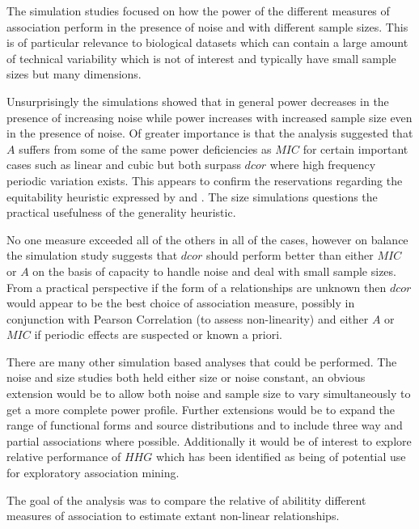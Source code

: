 \documentclass[a4paper, 12pt]{report}
\begin{document}
The simulation studies focused on how the power of the different measures of association perform in the presence of noise and with different sample sizes. This is of particular relevance to biological datasets which can contain a large amount of technical variability which is not of interest and typically have small sample sizes but many dimensions. 

Unsurprisingly the simulations showed that in general power decreases in the presence of increasing noise while power increases with increased sample size even in the presence of noise. Of greater importance is that the analysis suggested that $A$ suffers from some of the same power deficiencies as $MIC$ for certain important cases such as linear and cubic but both surpass $dcor$ where high frequency periodic variation exists. This appears to confirm the reservations regarding the equitability heuristic expressed by \citet{Kinney19082014} and \citet{Tibshirani2011}. The size simulations questions the practical usefulness of the generality heuristic.

No one measure exceeded all of the others in all of the cases, however on balance the simulation study suggests that $dcor$ should perform better than either $MIC$ or $A$ on the basis of capacity to handle noise and deal with small sample sizes. From a practical perspective if the form of a relationships are unknown then $dcor$ would appear to be the best choice of association measure, possibly in conjunction with Pearson Correlation (to assess non-linearity) and either $A$ or $MIC$ if periodic effects are suspected or known a priori.


There are many other simulation based analyses that could be performed. The noise and size studies both held either size or noise constant, an obvious extension would be to allow both noise and sample size to vary simultaneously to get a more complete power profile.  Further extensions would be to expand the range of functional forms and source distributions and to include three way and partial associations where possible. Additionally it would be of interest to explore  relative performance of $HHG$ \cite{HHG} which has been identified as being of potential use for exploratory association mining. 

The goal of the analysis was to compare the relative of abilitity different measures of association to estimate extant non-linear relationships. 
\end{document}
